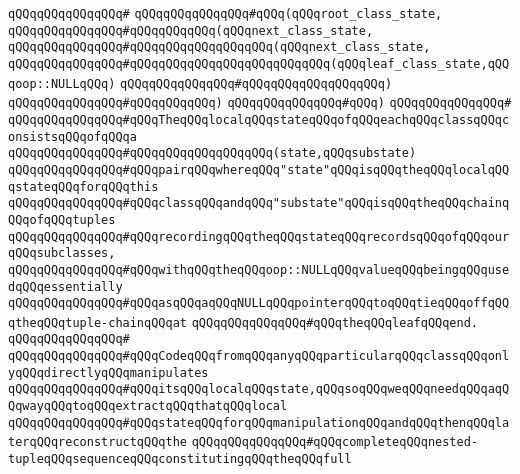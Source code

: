 \verb|qQQqqQQqqQQqqQQq#|\newline
\verb|qQQqqQQqqQQqqQQq#qQQq(qQQqroot_class_state,|\newline
\verb|qQQqqQQqqQQqqQQq#qQQqqQQqqQQq(qQQqnext_class_state,|\newline
\verb|qQQqqQQqqQQqqQQq#qQQqqQQqqQQqqQQqqQQq(qQQqnext_class_state,|\newline
\verb|qQQqqQQqqQQqqQQq#qQQqqQQqqQQqqQQqqQQqqQQqqQQq(qQQqleaf_class_state,qQQqoop::NULLqQQq)|\newline
\verb|qQQqqQQqqQQqqQQq#qQQqqQQqqQQqqQQqqQQq)|\newline
\verb|qQQqqQQqqQQqqQQq#qQQqqQQqqQQq)|\newline
\verb|qQQqqQQqqQQqqQQq#qQQq)|\newline
\verb|qQQqqQQqqQQqqQQq#|\newline
\verb|qQQqqQQqqQQqqQQq#qQQqTheqQQqlocalqQQqstateqQQqofqQQqeachqQQqclassqQQqconsistsqQQqofqQQqa|\newline
\verb|qQQqqQQqqQQqqQQq#qQQqqQQqqQQqqQQqqQQq(state,qQQqsubstate)|\newline
\verb|qQQqqQQqqQQqqQQq#qQQqpairqQQqwhereqQQq"state"qQQqisqQQqtheqQQqlocalqQQqstateqQQqforqQQqthis|\newline
\verb|qQQqqQQqqQQqqQQq#qQQqclassqQQqandqQQq"substate"qQQqisqQQqtheqQQqchainqQQqofqQQqtuples|\newline
\verb|qQQqqQQqqQQqqQQq#qQQqrecordingqQQqtheqQQqstateqQQqrecordsqQQqofqQQqourqQQqsubclasses,|\newline
\verb|qQQqqQQqqQQqqQQq#qQQqwithqQQqtheqQQqoop::NULLqQQqvalueqQQqbeingqQQqusedqQQqessentially|\newline
\verb|qQQqqQQqqQQqqQQq#qQQqasqQQqaqQQqNULLqQQqpointerqQQqtoqQQqtieqQQqoffqQQqtheqQQqtuple-chainqQQqat|\newline
\verb|qQQqqQQqqQQqqQQq#qQQqtheqQQqleafqQQqend.|\newline
\verb|qQQqqQQqqQQqqQQq#|\newline
\verb|qQQqqQQqqQQqqQQq#qQQqCodeqQQqfromqQQqanyqQQqparticularqQQqclassqQQqonlyqQQqdirectlyqQQqmanipulates|\newline
\verb|qQQqqQQqqQQqqQQq#qQQqitsqQQqlocalqQQqstate,qQQqsoqQQqweqQQqneedqQQqaqQQqwayqQQqtoqQQqextractqQQqthatqQQqlocal|\newline
\verb|qQQqqQQqqQQqqQQq#qQQqstateqQQqforqQQqmanipulationqQQqandqQQqthenqQQqlaterqQQqreconstructqQQqthe|\newline
\verb|qQQqqQQqqQQqqQQq#qQQqcompleteqQQqnested-tupleqQQqsequenceqQQqconstitutingqQQqtheqQQqfull|\newline
